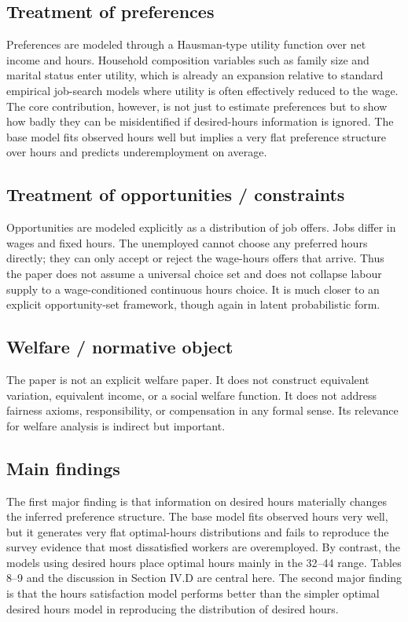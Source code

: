 \documentclass[11pt,a4paper]{article}
\begin{document}
\subsection*{Treatment of preferences}
Preferences are modeled through a Hausman-type utility function over net income and hours. Household composition variables such as family size and marital status enter utility, which is already an expansion relative to standard empirical job-search models where utility is often effectively reduced to the wage. The core contribution, however, is not just to estimate preferences but to show how badly they can be misidentified if desired-hours information is ignored. The base model fits observed hours well but implies a very flat preference structure over hours and predicts underemployment on average.

\subsection*{Treatment of opportunities / constraints}
Opportunities are modeled explicitly as a distribution of job offers. Jobs differ in wages and fixed hours. The unemployed cannot choose any preferred hours directly; they can only accept or reject the wage-hours offers that arrive. Thus the paper does not assume a universal choice set and does not collapse labour supply to a wage-conditioned continuous hours choice. It is much closer to an explicit opportunity-set framework, though again in latent probabilistic form.

\subsection*{Welfare / normative object}
The paper is not an explicit welfare paper. It does not construct equivalent variation, equivalent income, or a social welfare function. It does not address fairness axioms, responsibility, or compensation in any formal sense. Its relevance for welfare analysis is indirect but important.

\subsection*{Main findings}
The first major finding is that information on desired hours materially changes the inferred preference structure. The base model fits observed hours very well, but it generates very flat optimal-hours distributions and fails to reproduce the survey evidence that most dissatisfied workers are overemployed. By contrast, the models using desired hours place optimal hours mainly in the 32–44 range. Tables 8–9 and the discussion in Section IV.D are central here. The second major finding is that the hours satisfaction model performs better than the simpler optimal desired hours model in reproducing the distribution of desired hours.
\end{document}

